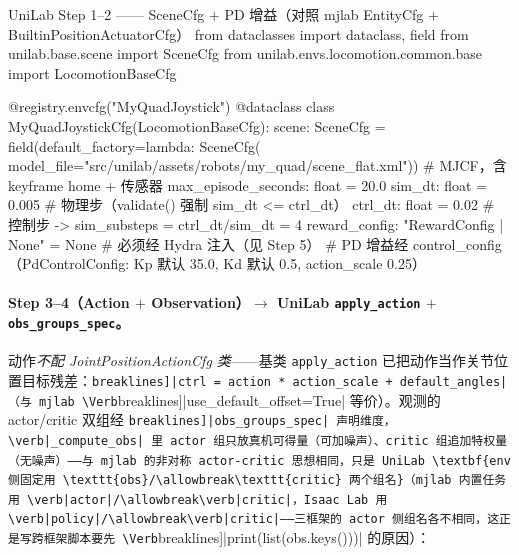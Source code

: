 \begin{codebox}[Python]{UniLab Step 1--2 —— SceneCfg $+$ PD 增益（对照 mjlab EntityCfg $+$ BuiltinPositionActuatorCfg）}
from dataclasses import dataclass, field
from unilab.base.scene import SceneCfg
from unilab.envs.locomotion.common.base import LocomotionBaseCfg

@registry.envcfg("MyQuadJoystick")
@dataclass
class MyQuadJoystickCfg(LocomotionBaseCfg):
    scene: SceneCfg = field(default_factory=lambda: SceneCfg(
        model_file="src/unilab/assets/robots/my_quad/scene_flat.xml"))  # MJCF，含 keyframe home + 传感器
    max_episode_seconds: float = 20.0
    sim_dt: float = 0.005          # 物理步（validate() 强制 sim_dt <= ctrl_dt）
    ctrl_dt: float = 0.02          # 控制步 -> sim_substeps = ctrl_dt/sim_dt = 4
    reward_config: "RewardConfig | None" = None   # 必须经 Hydra 注入（见 Step 5）
    # PD 增益经 control_config（PdControlConfig: Kp 默认 35.0, Kd 默认 0.5, action_scale 0.25）
\end{codebox}

\paragraph{Step 3--4（Action $+$ Observation）$\to$ UniLab \texttt{apply\_action} $+$ \texttt{obs\_groups\_spec}。}动作\emph{不配 JointPositionActionCfg 类}——基类 \verb|apply_action| 已把动作当作关节位置目标残差：\Verb[breaklines]|ctrl = action * action_scale + default_angles|（与 mjlab \Verb[breaklines]|use_default_offset=True| 等价）。观测的 actor/critic 双组经 \Verb[breaklines]|obs_groups_spec| 声明维度，\verb|_compute_obs| 里 actor 组只放真机可得量（可加噪声）、critic 组追加特权量（无噪声）——与 mjlab 的非对称 actor-critic 思想相同，只是 UniLab \textbf{env 侧固定用 \texttt{obs}/\allowbreak\texttt{critic} 两个组名}（mjlab 内置任务用 \verb|actor|/\allowbreak\verb|critic|，Isaac Lab 用 \verb|policy|/\allowbreak\verb|critic|——三框架的 actor 侧组名各不相同，这正是写跨框架脚本要先 \Verb[breaklines]|print(list(obs.keys()))| 的原因）：

